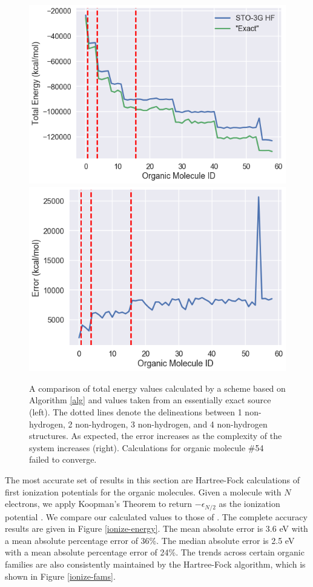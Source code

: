 \documentclass[12pt]{article}
\begin{document}
\begin{figure}[H]
\begin{center}
\includegraphics[scale=0.4]{img/org-tot-energy1}
\includegraphics[scale=0.4]{img/org-tot-energy2}
\end{center}
\caption{A comparison of total energy values calculated by a scheme based on Algorithm \ref{alg} and values taken from an essentially exact source \cite{montavon2013} (left).  The dotted lines denote the delineations between 1 non-hydrogen, 2 non-hydrogen, 3 non-hydrogen, and 4 non-hydrogen structures.  As expected, the error increases as the complexity of the system increases (right).  Calculations for organic molecule \#54 failed to converge.} \label{org-tot-energy}
\end{figure} 

The most accurate set of results in this section are Hartree-Fock calculations of first ionization potentials for the organic molecules.  Given a molecule with $N$ electrons, we apply Koopman's Theorem to return $-\epsilon_{N / 2}$ as the ionization potential \cite{szabo2012}.  We compare our calculated values to those of \cite{montavon2013}.  The complete accuracy results are given in Figure \ref{ionize-energy}.  The mean absolute error is 3.6 eV with a mean absolute percentage error of 36\%.  The median absolute error is 2.5 eV with a mean absolute percentage error of 24\%.  The trends across certain organic families are also consistently maintained by the Hartree-Fock algorithm, which is shown in Figure \ref{ionize-fams}.    
\end{document}
